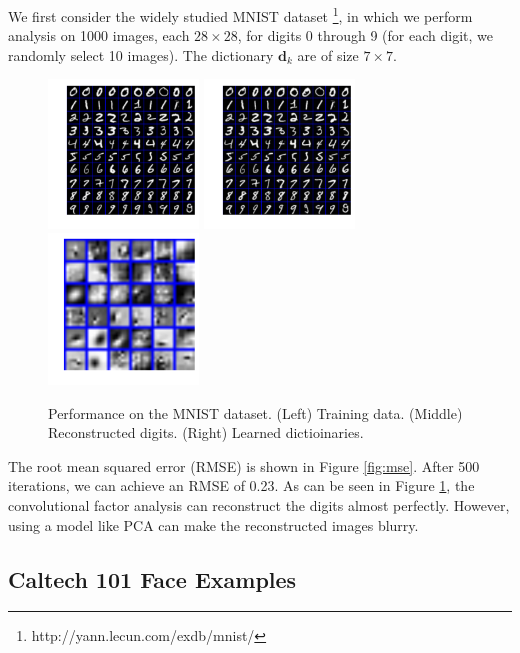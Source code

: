 \documentclass{article} %
\newcommand{\dv}{\boldsymbol{d}}
\begin{document}
We first consider the widely studied MNIST dataset \footnote{http://yann.lecun.com/exdb/mnist/}, in which we perform analysis on 1000 images, each $28 \times 28$, for digits 0 through 9 (for each digit, we randomly select 10 images). The dictionary $\dv_k$ are of size $7 \times 7$.

\begin{figure}[h]
   \centering
   \includegraphics[width=4cm]{figures/mnist_original}  
   \includegraphics[width=4cm]{figures/mnist_reconstruction} 
   \includegraphics[width=4cm]{figures/mnist_dictionary}
   \caption{\small{Performance on the MNIST dataset. (Left) Training data. (Middle) Reconstructed digits. (Right) Learned dictioinaries. }} \label{fig:mnist}
\end{figure}

The root mean squared error (RMSE) is shown in Figure \ref{fig:mse}. After 500 iterations, we can achieve an RMSE of 0.23. As can be seen in Figure \ref{fig:mnist}, the convolutional factor analysis can reconstruct the digits almost perfectly. However, using a model like PCA can make the reconstructed images blurry.

\subsection{Caltech 101 Face Examples}
\end{document}
